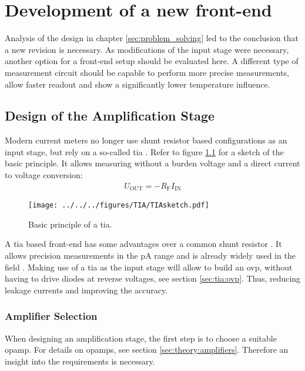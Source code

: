 
\chapter{Development of a new front-end}
\label{sec:newfrontend}
Analysis of the design in chapter \ref{sec:problem_solving} led to the conclusion that a new revision is necessary. As modifications of the input stage were necessary, another option for a front-end setup should be evaluated here. A different type of measurement circuit should be capable to perform more precise measurements, allow faster readout and show a significantly lower temperature influence.
\section{Design of the Amplification Stage}
Modern current meters no longer use shunt resistor based configurations as an input stage, but rely on a so-called \acl{tia} \cite{lowlvl}. Refer to figure \ref{fig:tia:sketch} for a sketch of the basic principle. It allows measuring without a burden voltage and a direct current to voltage conversion:
\begin{align}
\label{eq:tia}
U_\text{OUT}=-R_\text{F}I_\text{IN}
\end{align}
\begin{figure}
	\centering
	\texttt{[image: ../../../figures/TIA/TIAsketch.pdf]}
	\caption{Basic principle of a \ac{tia}.}
	\label{fig:tia:sketch}
\end{figure}
A \ac{tia} based front-end has some advantages over a common shunt resistor \cite{mortuza}. It allows precision measurements in the \ac{pA} range and is already widely used in the field \cite{zagreb}.
Making use of a \ac{tia} as the input stage will allow to build an \ac{ovp}, without having to drive diodes at reverse voltages, see section \ref{sec:tia:ovp}. Thus, reducing leakage currents and improving the accuracy.
\subsection*{Amplifier Selection}
When designing an amplification stage, the first step is to choose a suitable \ac{opamp}. For details on \acp{opamp}, see section \ref{sec:theory:amplifiers}.
Therefore an insight into the requirements is necessary.
